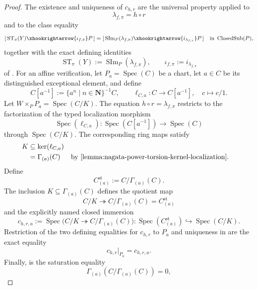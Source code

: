 \begin{proof}
  The existence and uniqueness of $c_{h,r}$ are the universal property
   applied to
  \[
    \lambda_{f,\pi}=h\circ r
  \]
  and to the class equality
  \[
    [\,\operatorname{ST}_\pi(Y)
      \xhookrightarrow{\iota_{f,\pi}}P\,]
      =[\,\operatorname{SIm}_P(\lambda_{f,\pi})
      \xhookrightarrow{i_{\lambda_{f,\pi}}}P\,]
      \quad\text{in }\operatorname{ClosedSub}(P),
  \]
  together with the exact defining identities
  \[
    \operatorname{ST}_\pi(Y)
      :=\operatorname{SIm}_P(\lambda_{f,\pi}),
    \qquad
    \iota_{f,\pi}:=i_{\lambda_{f,\pi}}
  \]
  of .  For an affine verification, let
  $P_a=\operatorname{Spec}(C)$ be a chart, let $a\in C$ be its distinguished
  exceptional element, and define
  \[
    C[a^{-1}]:=\{a^n\mid n\in\mathbf N\}^{-1}C,
    \qquad
    \ell_{C,a}\colon C\to C[a^{-1}],\quad c\mapsto c/1.
  \]
  Let $W\times_PP_a=\operatorname{Spec}(C/K)$.  The equation
  $h\circ r=\lambda_{f,\pi}$ restricts to the factorization of the typed
  localization morphism
  \[
    \operatorname{Spec}(\ell_{C,a})\colon
      \operatorname{Spec}(C[a^{-1}])\longrightarrow\operatorname{Spec}(C)
  \]
  through $\operatorname{Spec}(C/K)$.  The corresponding ring maps satisfy
  \[
  \begin{aligned}
    K&\subseteq\ker(\ell_{C,a})\\
     &=\Gamma_{(a)}(C)
       &&\text{by \Cref{lemma:nagata-power-torsion-kernel-localization}}.
  \end{aligned}
  \]
  Define
  \[
    C^{\mathrm{st}}_{(a)}:=C/\Gamma_{(a)}(C).
  \]
  The inclusion $K\subseteq\Gamma_{(a)}(C)$ defines the quotient map
  \[
    C/K\twoheadrightarrow C/\Gamma_{(a)}(C)
      =C^{\mathrm{st}}_{(a)}
  \]
  and the explicitly named closed immersion
  \[
    c_{h,r,a}:=
      \operatorname{Spec}
        \bigl(C/K\twoheadrightarrow C/\Gamma_{(a)}(C)\bigr)
      \colon
      \operatorname{Spec}(C^{\mathrm{st}}_{(a)})\hookrightarrow
      \operatorname{Spec}(C/K).
  \]
  Restriction of the two defining equalities for $c_{h,r}$ to $P_a$ and
  uniqueness in  are the exact
  equality
  \[
    c_{h,r}|_{P_a}=c_{h,r,a}.                                    \tag{SC1}
  \]
  Finally,  is the
  saturation equality
  \[
    \Gamma_{(a)}(C/\Gamma_{(a)}(C))=0,
  \]
\end{proof}

